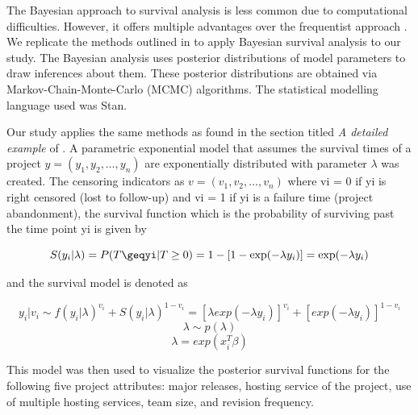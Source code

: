 \documentclass[acmconf]{acmart}
\begin{document}
The Bayesian approach to survival analysis is less common due to computational difficulties. However, it offers multiple advantages over the frequentist approach \cite{kelter2020bayesian}. 
We replicate the methods outlined in \cite{kelter2020bayesian} to apply Bayesian survival analysis to our study. 
The Bayesian analysis uses posterior distributions of model parameters to draw inferences about them. 
These posterior distributions are obtained via Markov-Chain-Monte-Carlo (MCMC) algorithms. 
The statistical modelling language used was Stan.

Our study applies the same methods as found in the section titled \emph{A detailed example} of \cite{kelter2020bayesian}. A parametric exponential model that assumes the survival times of a project $y = (y_1, y_2, \dots, y_n)$ are exponentially distributed with parameter $\lambda$ was created. 
The censoring indicators as $v = (v_1, v_2,\dots, v_n)$ where vi = 0 if yi is right censored (lost to follow-up) and vi = 1 if yi is a failure time (project abandonment), the survival function which is the probability of surviving past the time point yi is given by

\begin{equation}
S(y_i|\lambda) = P(T\geqyi|T\geq0) = 1 - [1 - \exp(-  \lambda y_i)] = \exp(- \lambda y_i)
\end{equation}

and the survival model is denoted as

\begin{equation}
y_i|v_i \sim f(y_i| \lambda)^{v_i} + S(y_i| \lambda)^{1-v_i} = [\lambda exp(-  \lambda y_i)]^{v_i} + [exp(-  \lambda y_i)]^{1-v_i}
\end{equation}
\begin{equation}
\lambda \sim p(\lambda)
\end{equation}
\begin{equation}
\lambda = exp(x_i^T \beta)
\end{equation}

This model was then used to visualize the posterior survival functions for the following five project attributes: major releases, hosting service of the project, use of multiple hosting services, team size, and revision frequency. 

\end{document}
